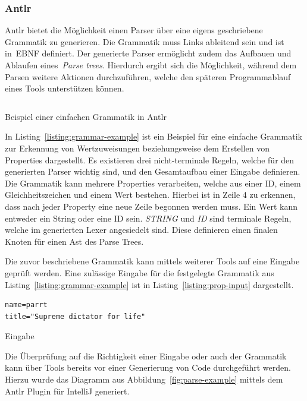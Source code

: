 \subsubsection{Antlr}\label{subsubsec:antlr}
\ac{Antlr} bietet die Möglichkeit einen Parser über eine eigens geschriebene Grammatik zu generieren.
Die Grammatik muss Links ableitend sein und ist in~\ac{EBNF} definiert.
Der generierte Parser ermöglicht zudem das Aufbauen und Ablaufen eines~\textit{Parse trees}.
Hierdurch ergibt sich die Möglichkeit, während dem Parsen weitere Aktionen durchzuführen, welche den späteren Programmablauf eines Tools unterstützen können.

\begin{listing}[!ht]
    \inputminted{antlr-java}{listings/2.2.1/AntlrExample.g4}
    \caption{Beispiel einer einfachen Grammatik in Antlr}
    \label{listing:grammar-example}
\end{listing}

In Listing~\ref{listing:grammar-example} ist ein Beispiel für eine einfache Grammatik zur Erkennung von Wertzuweisungen beziehungsweise dem Erstellen von
Properties dargestellt.\cite*{antlrOrg}
Es existieren drei nicht-terminale Regeln, welche für den generierten Parser wichtig sind, und den Gesamtaufbau einer Eingabe definieren.
Die Grammatik kann mehrere Properties verarbeiten, welche aus einer ID, einem Gleichheitszeichen und einem Wert bestehen.
Hierbei ist in Zeile 4 zu erkennen, dass nach jeder Property eine neue Zeile begonnen werden muss.
Ein Wert kann entweder ein String oder eine ID sein.
\textit{STRING} und \textit{ID}  sind terminale Regeln, welche im generierten Lexer angesiedelt sind.
Diese definieren einen finalen Knoten für einen Ast des Parse Trees.

Die zuvor beschriebene Grammatik kann mittels weiterer Tools auf eine Eingabe geprüft werden.
Eine zulässige Eingabe für die festgelegte Grammatik aus Listing~\ref{listing:grammar-example} ist in Listing~\ref{listing:prop-input} dargestellt.

\begin{listing}[!ht]
    \begin{verbatim}
name=parrt
title="Supreme dictator for life"

    \end{verbatim}
    \caption{Eingabe}
    \label{listing:prop-input}
\end{listing}

Die Überprüfung auf die Richtigkeit einer Eingabe oder auch der Grammatik kann über Tools bereits vor einer Generierung von Code durchgeführt werden.
Hierzu wurde das Diagramm aus Abbildung~\ref{fig:parse-example} mittels dem Antlr Plugin für IntelliJ generiert.

